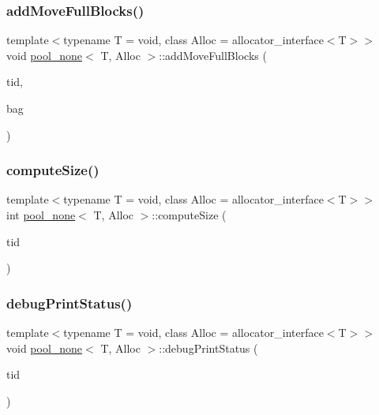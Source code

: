 \subsubsection{\texorpdfstring{add\+Move\+Full\+Blocks()}{addMoveFullBlocks()}\hspace{0.1cm}{\footnotesize\ttfamily [2/2]}}
{\footnotesize\ttfamily template$<$typename T  = void, class Alloc  = allocator\+\_\+interface$<$\+T$>$$>$ \\
void \hyperlink{classpool__none}{pool\+\_\+none}$<$ T, Alloc $>$\+::add\+Move\+Full\+Blocks (\begin{DoxyParamCaption}\item[{const int}]{tid,  }\item[{\hyperlink{classblockbag}{blockbag}$<$ T $>$ $\ast$}]{bag }\end{DoxyParamCaption})\hspace{0.3cm}{\ttfamily [inline]}}

\mbox{\label{classpool__none_a7c1e31b11de7a07d4bdb950ba5aa5508}} 
\subsubsection{\texorpdfstring{compute\+Size()}{computeSize()}}
{\footnotesize\ttfamily template$<$typename T  = void, class Alloc  = allocator\+\_\+interface$<$\+T$>$$>$ \\
int \hyperlink{classpool__none}{pool\+\_\+none}$<$ T, Alloc $>$\+::compute\+Size (\begin{DoxyParamCaption}\item[{const int}]{tid }\end{DoxyParamCaption})\hspace{0.3cm}{\ttfamily [inline]}}

\mbox{\label{classpool__none_ad2f9a5fa2c6bb00e00b769681476a084}} 
\subsubsection{\texorpdfstring{debug\+Print\+Status()}{debugPrintStatus()}}
{\footnotesize\ttfamily template$<$typename T  = void, class Alloc  = allocator\+\_\+interface$<$\+T$>$$>$ \\
void \hyperlink{classpool__none}{pool\+\_\+none}$<$ T, Alloc $>$\+::debug\+Print\+Status (\begin{DoxyParamCaption}\item[{const int}]{tid }\end{DoxyParamCaption})\hspace{0.3cm}{\ttfamily [inline]}}

